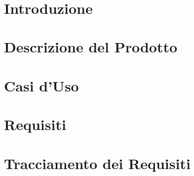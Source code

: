 \documentclass[12pt, a4paper,table]{article}
\title{\textsc{\docNome}}
\author{}
\date{}
\begin{document}


\tableofcontents
\newpage
\section{Introduzione}

\newpage
\section{Descrizione del Prodotto}

\newpage
\section{Casi d'Uso}

\newpage
\section{Requisiti}

\newpage
\section{Tracciamento dei Requisiti}

\newpage
\end{document}

